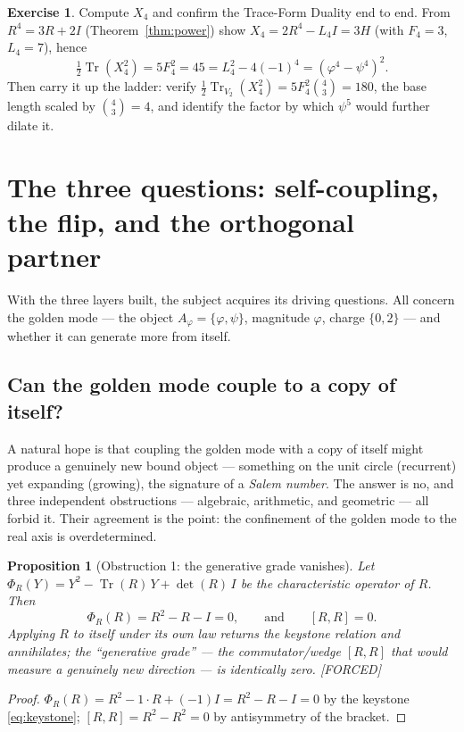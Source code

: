 \documentclass[11pt]{article}
\theoremstyle{plain}
\newtheorem{proposition}[theorem]{Proposition}
\theoremstyle{definition}
\newtheorem{exercise}[theorem]{Exercise}
\theoremstyle{remark}
\newcommand{\Forced}{\textcolor{forcedc}{[FORCED]}}
\newcommand{\Tr}{\operatorname{Tr}}
\begin{document}
\begin{exercise}\label{exr:deviation}
Compute $X_4$ and confirm the Trace-Form Duality end to end. From $R^{4}=3R+2I$ (Theorem~\ref{thm:power}) show $X_4=2R^{4}-L_4I=3H$ (with $F_4=3$, $L_4=7$), hence
\[
\tfrac12\Tr(X_4^{2})=5F_4^{2}=45=L_4^{2}-4(-1)^{4}=(φ^{4}-ψ^{4})^{2}.
\]
Then carry it up the ladder: verify $\tfrac12\Tr_{V_2}(X_4^{2})=5F_4^{2}\binom{4}{3}=180$, the base length scaled by $\binom{4}{3}=4$, and identify the factor by which $ψ^{5}$ would further dilate it.
\end{exercise}

\section{The three questions: self-coupling, the flip, and the orthogonal partner}\label{sec:selfcouple}

With the three layers built, the subject acquires its driving questions. All concern the golden mode --- the object $A_φ=\{φ,ψ\}$, magnitude $φ$, charge $\{0,2\}$ --- and whether it can generate more from itself.

\subsection{Can the golden mode couple to a copy of itself?}
A natural hope is that coupling the golden mode with a copy of itself might produce a genuinely new bound object --- something on the unit circle (recurrent) yet expanding (growing), the signature of a \emph{Salem number}. The answer is no, and three independent obstructions --- algebraic, arithmetic, and geometric --- all forbid it. Their agreement is the point: the confinement of the golden mode to the real axis is overdetermined.

\begin{proposition}[Obstruction 1: the generative grade vanishes]\label{prop:obs1}
Let $Φ_R(Y)=Y^{2}-\Tr(R)\,Y+\det(R)\,I$ be the characteristic operator of $R$. Then
\[
Φ_R(R)=R^{2}-R-I=0,\qquad\text{and}\qquad [R,R]=0 .
\]
Applying $R$ to itself under its own law returns the keystone relation and annihilates; the ``generative grade'' --- the commutator/wedge $[R,R]$ that would measure a genuinely new direction --- is identically zero. \Forced
\end{proposition}
\begin{proof}
$Φ_R(R)=R^{2}-1\cdot R+(-1)I=R^{2}-R-I=0$ by the keystone \eqref{eq:keystone}; $[R,R]=R^{2}-R^{2}=0$ by antisymmetry of the bracket.
\end{proof}
\end{document}
